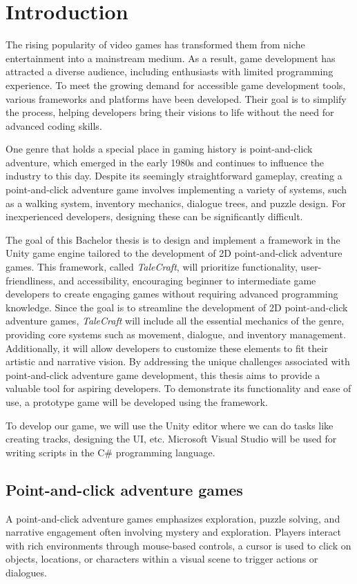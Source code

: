 \chapter{Introduction}
The rising popularity of video games has transformed them from niche entertainment into a mainstream medium. As a result, game development has attracted a diverse audience, including enthusiasts with limited programming experience. To meet the growing demand for accessible game development tools, various frameworks and platforms have been developed. Their goal is to simplify the process, helping developers bring their visions to life without the need for advanced coding skills.

One genre that holds a special place in gaming history is point-and-click adventure, which emerged in the early 1980s and continues to influence the industry to this day. Despite its seemingly straightforward gameplay, creating a point-and-click adventure game involves implementing a variety of systems, such as a walking system, inventory mechanics, dialogue trees, and puzzle design. For inexperienced developers, designing these can be significantly difficult.

The goal of this Bachelor thesis is to design and implement a framework in the Unity game engine tailored to the development of 2D point-and-click adventure games. This framework, called \textit{TaleCraft}, will prioritize functionality, user-friendliness, and accessibility, encouraging beginner to intermediate game developers to create engaging games without requiring advanced programming knowledge. Since the goal is to streamline the development of 2D point-and-click adventure games, \textit{TaleCraft} will include all the essential mechanics of the genre, providing core systems such as movement, dialogue, and inventory management. Additionally, it will allow developers to customize these elements to fit their artistic and narrative vision. By addressing the unique challenges associated with point-and-click adventure game development, this thesis aims to provide a valuable tool for aspiring developers. To demonstrate its functionality and ease of use, a prototype game will be developed using the framework. 

To develop our game, we will use the Unity editor where we can do tasks like creating tracks, designing the UI, etc. Microsoft Visual Studio will be used for writing scripts in the C\# programming language. 

\section{Point-and-click adventure games}
A point-and-click adventure games emphasizes exploration, puzzle solving, and narrative engagement often involving mystery and exploration. Players interact with rich environments through mouse-based controls, a cursor is used to click on objects, locations, or characters within a visual scene to trigger actions or dialogues. 

